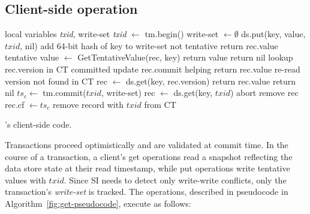 \subsection{Client-side operation}
\label{ssec:client-side}

\begin{algorithm}[ht!]
\begin{algorithmic}[1]
\begin{small}
\State local variables \emph{txid}, write-set
{}
\State \emph{txid} $\leftarrow$ {\sc tm.begin()}
\State write-set $\leftarrow \emptyset$
\EndProcedure
{} 
\State ds.put(key, value, $txid$, nil) \label{l:put}
\State add 64-bit hash of key to write-set
\EndProcedure
{} 
 \label{l:get_loop}
    \Comment not tentative
        \State return rec.value  \label{l:get_found} \EndIf
   \Else \Comment tentative
      \State value $\leftarrow$ {\sc GetTentativeValue}(rec, key)
	\State return value
      \EndIf
   \EndIf
\EndFor
\State return nil
\EndProcedure
{} \label{l:get_tentative}
 \State lookup rec.version in CT
  \Comment  committed
       \State update rec.commit \Comment helping 
         return rec.value \EndIf
\Else
\Comment re-read version not found in CT \label{l:get_reread}
         \State  rec $ \leftarrow$ ds.get(key, rec.version) 
		\State return rec.value \EndIf %
\EndIf
\State return nil
\EndProcedure
{}
\State  $ts_c \leftarrow$ {\sc tm.commit}($txid$, write-set)
	\State rec $\leftarrow$ ds.get(key, $txid$)
	 \Comment abort
		\State remove rec
	\Else
		\State rec.cf $\leftarrow ts_c$  
	\EndIf
\EndFor
\State remove record with $txid$ from CT
\EndProcedure
\end{small}
\end{algorithmic}
\caption{\sys's client-side code.} 
\label{fig:get-pseudocode}
\end{algorithm} 

Transactions proceed optimistically and are validated at commit time. In the course of a transaction, a client's get operations read a  snapshot 
reflecting the data store state  at  
their read timestamp, while put operations write tentative values with $txid$. 
Since SI needs to detect only write-write conflicts, only the transaction's \emph{write-set} is tracked.
%
The  operations, described in pseudocode in Algorithm~\ref{fig:get-pseudocode},   execute as follows:

